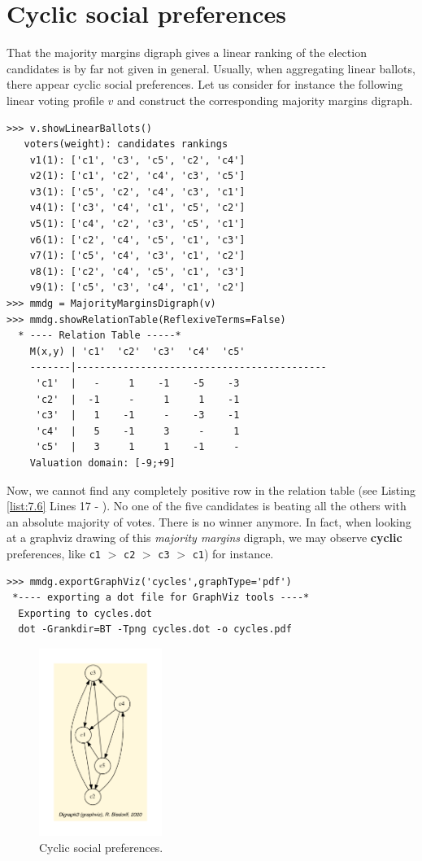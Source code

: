 \section{Cyclic social preferences}
\label{sec:7.4}

That the majority margins digraph gives a linear ranking of the election candidates is by far not given in general. Usually, when aggregating linear ballots, there appear cyclic social preferences. Let us consider for instance the following linear voting profile $v$ and construct the corresponding majority margins digraph.
\begin{lstlisting}[caption={Example of cyclic social preferences},label=list:7.6]
>>> v.showLinearBallots()
   voters(weight): candidates rankings
    v1(1): ['c1', 'c3', 'c5', 'c2', 'c4']
    v2(1): ['c1', 'c2', 'c4', 'c3', 'c5']
    v3(1): ['c5', 'c2', 'c4', 'c3', 'c1']
    v4(1): ['c3', 'c4', 'c1', 'c5', 'c2']
    v5(1): ['c4', 'c2', 'c3', 'c5', 'c1']
    v6(1): ['c2', 'c4', 'c5', 'c1', 'c3']
    v7(1): ['c5', 'c4', 'c3', 'c1', 'c2']
    v8(1): ['c2', 'c4', 'c5', 'c1', 'c3']
    v9(1): ['c5', 'c3', 'c4', 'c1', 'c2']
>>> mmdg = MajorityMarginsDigraph(v)
>>> mmdg.showRelationTable(ReflexiveTerms=False)
  * ---- Relation Table -----*
    M(x,y) | 'c1'  'c2'  'c3'  'c4'  'c5'	  
    -------|-------------------------------------------
     'c1'  |   -     1    -1    -5    -3	 
     'c2'  |  -1     - 	   1     1    -1	 
     'c3'  |   1    -1 	   -    -3    -1	 
     'c4'  |   5    -1     3     -     1	 
     'c5'  |   3     1 	   1    -1     - 	 
    Valuation domain: [-9;+9]
\end{lstlisting}    
Now, we cannot find any completely positive row in the relation table (see Listing \ref{list:7.6} Lines 17 - ). No one of the five candidates is beating all the others with an absolute majority of votes. There is no \Condorcet winner anymore. In fact, when looking at a graphviz drawing of this \emph{majority margins} digraph, we may observe \textbf{cyclic} preferences, like \texttt{c1} $>$ \texttt{c2} $>$ \texttt{c3} $>$ \texttt{c1}) for instance.
\begin{lstlisting}
>>> mmdg.exportGraphViz('cycles',graphType='pdf')
 *---- exporting a dot file for GraphViz tools ----*
  Exporting to cycles.dot
  dot -Grankdir=BT -Tpng cycles.dot -o cycles.pdf
\end{lstlisting}
\begin{figure}[h]
\sidecaption[t]
\includegraphics[width=4cm]{Figures/cycles.pdf}
\caption{Cyclic social preferences.}
\label{fig:7.2}       %
\end{figure}
	   
